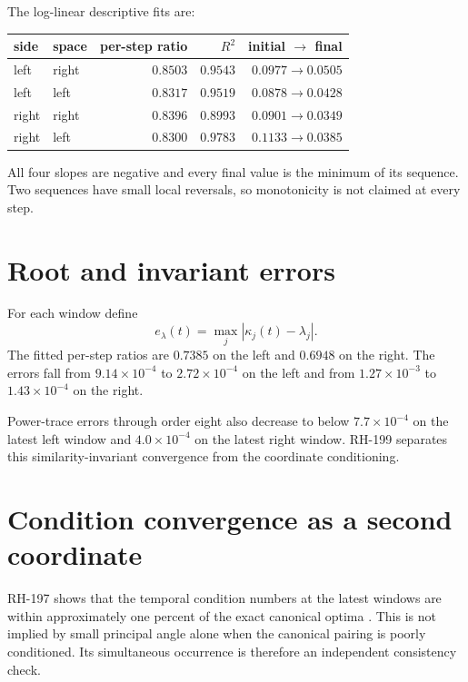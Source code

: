 \documentclass[12pt]{article}
\theoremstyle{remark}
\begin{document}
The log-linear descriptive fits are:
\begin{center}
\begin{tabular}{llrrr}
\toprule
side & space & per-step ratio & $R^2$ & initial $\to$ final\\
\midrule
left & right & $0.8503$ & $0.9543$ & $0.0977\to0.0505$\\
left & left & $0.8317$ & $0.9519$ & $0.0878\to0.0428$\\
right & right & $0.8396$ & $0.8993$ & $0.0901\to0.0349$\\
right & left & $0.8300$ & $0.9783$ & $0.1133\to0.0385$\\
\bottomrule
\end{tabular}
\end{center}

All four slopes are negative and every final value is the minimum of its
sequence.  Two sequences have small local reversals, so monotonicity is not
claimed at every step.

\section{Root and invariant errors}

For each window define
\begin{equation}\label{eq:root-error}
 e_\lambda(t)=\max_j|\kappa_j(t)-\lambda_j|.
\end{equation}
The fitted per-step ratios are $0.7385$ on the left and $0.6948$ on the
right.  The errors fall from $9.14\times10^{-4}$ to
$2.72\times10^{-4}$ on the left and from $1.27\times10^{-3}$ to
$1.43\times10^{-4}$ on the right.

Power-trace errors through order eight also decrease to below
$7.7\times10^{-4}$ on the latest left window and
$4.0\times10^{-4}$ on the latest right window.  RH-199 separates this
similarity-invariant convergence from the coordinate conditioning.

\section{Condition convergence as a second coordinate}

RH-197 shows that the temporal condition numbers at the latest windows are
within approximately one percent of the exact canonical optima
\citep{WangRH197}.  This is not implied by small principal angle alone when
the canonical pairing is poorly conditioned.  Its simultaneous occurrence
is therefore an independent consistency check.
\end{document}

